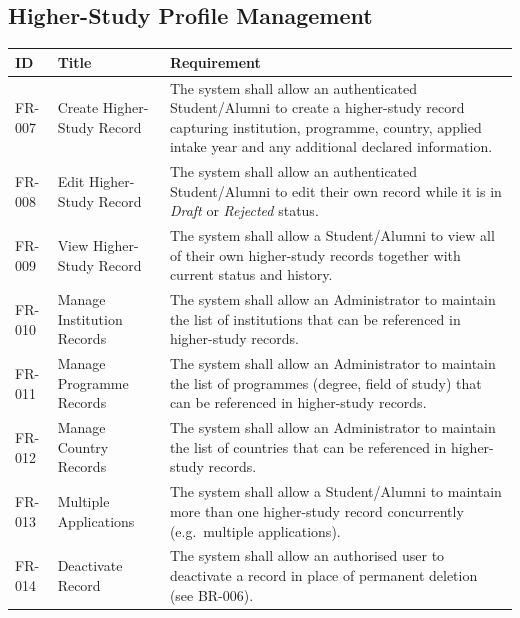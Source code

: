 \documentclass[11pt,a4paper]{article}
\begin{document}
\subsection{Higher-Study Profile Management}
\begin{tabularx}{\textwidth}{@{}p{1.6cm} p{4.0cm} Y@{}}
\caption{Functional requirements -- Higher-Study Profile Management.}
\label{tab:fr-profile}
\toprule
\textbf{ID} & \textbf{Title} & \textbf{Requirement} \\
\midrule
FR-007 & Create Higher-Study Record &
  The system shall allow an authenticated Student/Alumni to create a higher-study record capturing institution, programme, country, applied intake year and any additional declared information. \\
FR-008 & Edit Higher-Study Record &
  The system shall allow an authenticated Student/Alumni to edit their own record while it is in \emph{Draft} or \emph{Rejected} status. \\
FR-009 & View Higher-Study Record &
  The system shall allow a Student/Alumni to view all of their own higher-study records together with current status and history. \\
FR-010 & Manage Institution Records &
  The system shall allow an Administrator to maintain the list of institutions that can be referenced in higher-study records. \\
FR-011 & Manage Programme Records &
  The system shall allow an Administrator to maintain the list of programmes (degree, field of study) that can be referenced in higher-study records. \\
FR-012 & Manage Country Records &
  The system shall allow an Administrator to maintain the list of countries that can be referenced in higher-study records. \\
FR-013 & Multiple Applications &
  The system shall allow a Student/Alumni to maintain more than one higher-study record concurrently (e.g.\ multiple applications). \\
FR-014 & Deactivate Record &
  The system shall allow an authorised user to deactivate a record in place of permanent deletion (see BR-006). \\
\bottomrule
\end{tabularx}
\end{document}
